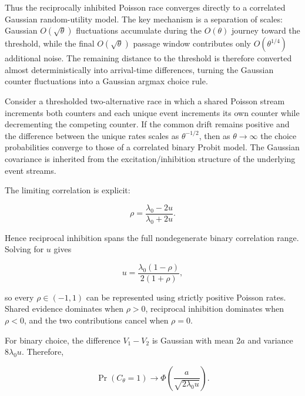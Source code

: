 \documentclass[
  man,
  floatsintext,
  longtable,
  a4paper,
  nolmodern,
  notxfonts,
  notimes,
  colorlinks=true,linkcolor=blue,citecolor=blue,urlcolor=blue]{apa7}
\begin{document}
Thus the reciprocally inhibited Poisson race converges directly to a
correlated Gaussian random-utility model. The key mechanism is a
separation of scales: Gaussian \(O(\sqrt{\theta})\) fluctuations
accumulate during the \(O(\theta)\) journey toward the threshold, while
the final \(O(\sqrt{\theta})\) passage window contributes only
\(O(\theta^{1/4})\) additional noise. The remaining distance to the
threshold is therefore converted almost deterministically into
arrival-time differences, turning the Gaussian counter fluctuations into
a Gaussian argmax choice rule.

\begin{tcolorbox}[enhanced jigsaw, arc=.35mm, bottomrule=.15mm, bottomtitle=1mm, breakable, colback=white, colbacktitle=quarto-callout-note-color!10!white, colframe=quarto-callout-note-color-frame, coltitle=black, left=2mm, leftrule=.75mm, opacityback=0, opacitybacktitle=0.6, rightrule=.15mm, title={Result 4 (Correlated Probit Limit Under Reciprocal Inhibition)}, titlerule=0mm, toprule=.15mm, toptitle=1mm]

Consider a thresholded two-alternative race in which a shared Poisson
stream increments both counters and each unique event increments its own
counter while decrementing the competing counter. If the common drift
remains positive and the difference between the unique rates scales as
\(\theta^{-1/2}\), then as \(\theta\to\infty\) the choice probabilities
converge to those of a correlated binary Probit model. The Gaussian
covariance is inherited from the excitation/inhibition structure of the
underlying event streams.

\end{tcolorbox}

The limiting correlation is explicit:

\[
\rho
=
\frac{\lambda_0-2u}{\lambda_0+2u}.
\]

Hence reciprocal inhibition spans the full nondegenerate binary
correlation range. Solving for \(u\) gives

\[
u
=
\frac{\lambda_0(1-\rho)}
{2(1+\rho)},
\]

so every \(\rho\in(-1,1)\) can be represented using strictly positive
Poisson rates. Shared evidence dominates when \(\rho>0\), reciprocal
inhibition dominates when \(\rho<0\), and the two contributions cancel
when \(\rho=0\).

For binary choice, the difference \(V_1-V_2\) is Gaussian with mean
\(2a\) and variance \(8\lambda_0 u\). Therefore,

\[
\Pr(C_\theta=1)
\longrightarrow
\Phi
\left(
\frac{a}{\sqrt{2\lambda_0 u}}
\right).
\]
\end{document}
